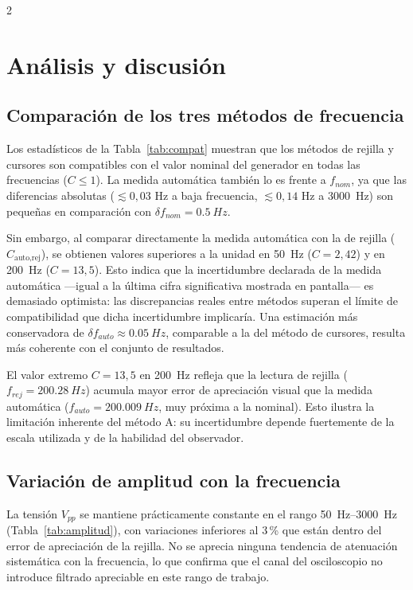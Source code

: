 \documentclass[12pt,a4paper]{article}
\begin{document}
\begin{multicols}{2}

\section{Análisis y discusión}

\subsection{Comparación de los tres métodos de frecuencia}

Los estadísticos de la Tabla~\ref{tab:compat} muestran que los métodos de rejilla y cursores son compatibles con el valor nominal del generador en todas las frecuencias ($C \leq 1$). La medida automática también lo es frente a $f_{nom}$, ya que las diferencias absolutas ($\lesssim 0{,}03$ Hz a baja frecuencia, $\lesssim 0{,}14$ Hz a \SI{3000}{Hz}) son pequeñas en comparación con $\delta f_{nom} = \SI{0,5}{Hz}$.

Sin embargo, al comparar directamente la medida automática con la de rejilla ($C_{\text{auto},\text{rej}}$), se obtienen valores superiores a la unidad en \SI{50}{Hz} ($C = 2{,}42$) y en \SI{200}{Hz} ($C = 13{,}5$). Esto indica que la incertidumbre declarada de la medida automática ---igual a la última cifra significativa mostrada en pantalla--- es demasiado optimista: las discrepancias reales entre métodos superan el límite de compatibilidad que dicha incertidumbre implicaría. Una estimación más conservadora de $\delta f_{auto} \approx \SI{0,05}{Hz}$, comparable a la del método de cursores, resulta más coherente con el conjunto de resultados.

El valor extremo $C = 13{,}5$ en \SI{200}{Hz} refleja que la lectura de rejilla ($f_{rej} = \SI{200,28}{Hz}$) acumula mayor error de apreciación visual que la medida automática ($f_{auto} = \SI{200,009}{Hz}$, muy próxima a la nominal). Esto ilustra la limitación inherente del método A: su incertidumbre depende fuertemente de la escala utilizada y de la habilidad del observador.

\subsection{Variación de amplitud con la frecuencia}

La tensión $V_{pp}$ se mantiene prácticamente constante en el rango \SIrange{50}{3000}{\hertz} (Tabla~\ref{tab:amplitud}), con variaciones inferiores al $3\,$\% que están dentro del error de apreciación de la rejilla. No se aprecia ninguna tendencia de atenuación sistemática con la frecuencia, lo que confirma que el canal del osciloscopio no introduce filtrado apreciable en este rango de trabajo.


\end{multicols}
\end{document}
